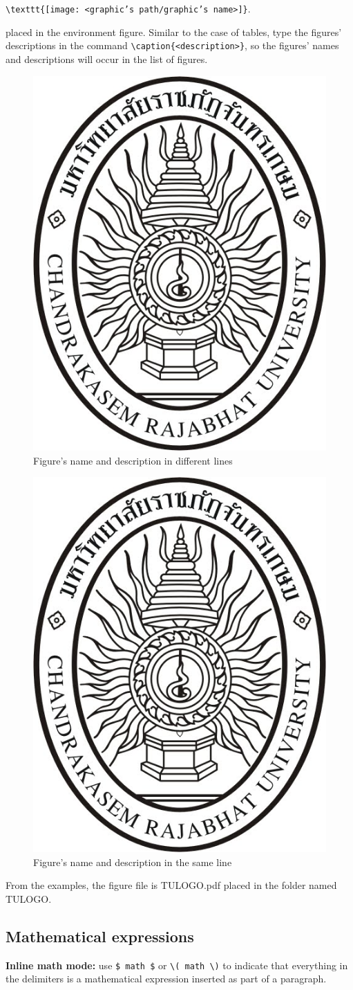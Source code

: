 \hspace*{-1cm}\verb|\texttt{[image: <graphic’s path/graphic’s name>]}|.\vskip2mm

\subsectionindent placed in the environment figure. Similar to the case of tables, type the figures’ descriptions in the command \verb|\caption{<description>}|, so the figures’ names and descriptions will occur in the list of figures.

\begin{figure}[!h]
	\centering
	\includegraphics[width=0.3\linewidth]{CRU_LOGO/CRU_Chandra.jpg}
	\caption[Figure’s name and description in different lines]{\newline Figure’s name and description in different lines}
\end{figure}


\begin{figure}[!h]
	\centering
	\includegraphics[width=0.3\linewidth]{CRU_LOGO/CRU_Chandra.jpg}
	\caption{Figure’s name and description in the same line}
\end{figure}

\noindent From the examples, the figure file is TULOGO.pdf placed in the folder named TULOGO.


\subsection{Mathematical expressions}

\noindent \textbf{Inline math mode:} use \verb|$ math $| or \verb|\( math \)| to indicate that everything in the delimiters is a mathematical expression inserted as part of a paragraph.

